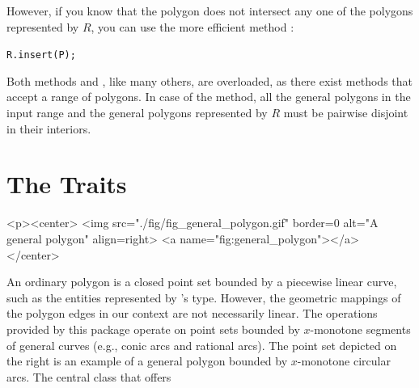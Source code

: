 However, if you know that the polygon does not intersect any one of the
polygons represented by $R$, you can use the more efficient method
:

\begin{alltt}
R.insert(P);
\end{alltt}

Both methods  and , like many others, are 
overloaded, as there exist methods that accept a range of polygons. 
In case of the  method, all the general polygons in the 
input range and the general polygons represented by
$R$ must be pairwise disjoint in their interiors.

\section{The Traits}
\label{bso_sec:traits}
\lcTex{%
  \setlength{\widthRight}{1.4cm}
  \setlength{\widthLeft}{\widthLineReal}
  \addtolength{\widthLeft}{-\widthRight}
  \begin{minipage}{\widthLeft}
}
\label{fig:general_polygon}
\begin{ccHtmlOnly}
  <p><center>
    <img src="./fig/fig_general_polygon.gif" border=0 alt="A general polygon" align=right>
  <a name="fig:general_polygon"></a>
  </center>
\end{ccHtmlOnly}
An ordinary polygon is a closed point set bounded by a piecewise linear 
curve, such as the entities represented by \cgal 's  type. 
However, the geometric mappings of the polygon edges in our context are not
necessarily linear. The operations provided by this package operate on point 
sets bounded by $x$-monotone segments of general curves (e.g., conic arcs and 
rational arcs). The point set depicted on the right is an example of a 
general polygon bounded by $x$-monotone circular arcs. The central class 
 that offers
\\

